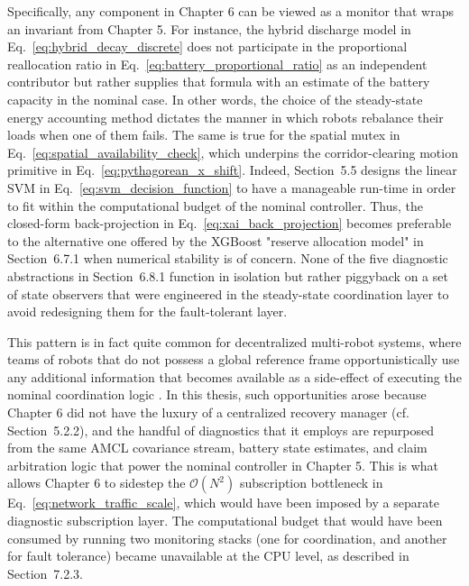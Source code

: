 Specifically, any component in Chapter 6 can be viewed as a monitor that wraps an invariant from Chapter 5. For instance, the hybrid discharge model in Eq.~\eqref{eq:hybrid_decay_discrete} does not participate in the proportional reallocation ratio in Eq.~\eqref{eq:battery_proportional_ratio} as an independent contributor but rather supplies that formula with an estimate of the battery capacity in the nominal case. In other words, the choice of the steady-state energy accounting method dictates the manner in which robots rebalance their loads when one of them fails. The same is true for the spatial mutex in Eq.~\eqref{eq:spatial_availability_check}, which underpins the corridor-clearing motion primitive in Eq.~\eqref{eq:pythagorean_x_shift}. Indeed, Section~5.5 designs the linear SVM in Eq.~\eqref{eq:svm_decision_function} to have a manageable run-time in order to fit within the computational budget of the nominal controller. Thus, the closed-form back-projection in Eq.~\eqref{eq:xai_back_projection} becomes preferable to the alternative one offered by the XGBoost "reserve allocation model" in Section~6.7.1 when numerical stability is of concern. None of the five diagnostic abstractions in Section~6.8.1 function in isolation but rather piggyback on a set of state observers that were engineered in the steady-state coordination layer to avoid redesigning them for the fault-tolerant layer.

This pattern is in fact quite common for decentralized multi-robot systems, where teams of robots that do not possess a global reference frame opportunistically use any additional information that becomes available as a side-effect of executing the nominal coordination logic \cite{zhang2025survey}. In this thesis, such opportunities arose because Chapter 6 did not have the luxury of a centralized recovery manager (cf. Section~5.2.2), and the handful of diagnostics that it employs are repurposed from the same AMCL covariance stream, battery state estimates, and claim arbitration logic that power the nominal controller in Chapter 5. This is what allows Chapter 6 to sidestep the $\mathcal{O}(N^2)$ subscription bottleneck in Eq.~\eqref{eq:network_traffic_scale}, which would have been imposed by a separate diagnostic subscription layer. The computational budget that would have been consumed by running two monitoring stacks (one for coordination, and another for fault tolerance) became unavailable at the CPU level, as described in Section~7.2.3.

